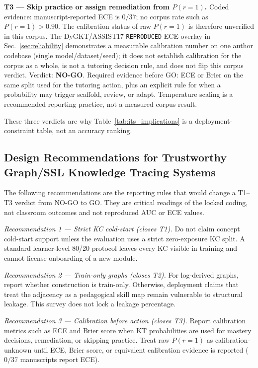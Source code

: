 \documentclass[lettersize,journal]{IEEEtran}
\begin{document}
\textbf{T3 --- Skip practice or assign remediation from $P(r=1)$.}
Coded evidence: manuscript-reported ECE is $0/37$; no corpus rate such as $P(r=1)>0.90$. The calibration status of raw $P(r=1)$ is therefore unverified in this corpus. The DyGKT/ASSIST17 \texttt{REPRODUCED} ECE overlay in Sec.~\ref{sec:reliability} demonstrates a measurable calibration number on one author codebase (single model/dataset/seed); it does not establish calibration for the corpus as a whole, is not a tutoring decision rule, and does not flip this corpus verdict.
Verdict: \textbf{NO-GO}. Required evidence before GO: ECE or Brier on the same split used for the tutoring action, plus an explicit rule for when a probability may trigger scaffold, review, or adapt. Temperature scaling is a recommended reporting practice, not a measured corpus result.

These three verdicts are why Table~\ref{tab:its_implications} is a deployment-constraint table, not an accuracy ranking.

\subsection{Design Recommendations for Trustworthy Graph/SSL Knowledge Tracing Systems}
\label{sec:design_recs}
The following recommendations are the reporting rules that would change a T1--T3 verdict from NO-GO to GO. They are critical readings of the locked coding, not classroom outcomes and not reproduced AUC or ECE values.

\textit{Recommendation 1 --- Strict KC cold-start (closes T1).} Do not claim concept cold-start support unless the evaluation uses a strict zero-exposure KC split. A standard learner-level 80/20 protocol leaves every KC visible in training and cannot license onboarding of a new module.

\textit{Recommendation 2 --- Train-only graphs (closes T2).} For log-derived graphs, report whether construction is train-only. Otherwise, deployment claims that treat the adjacency as a pedagogical skill map remain vulnerable to structural leakage. This survey does not lock a leakage percentage.

\textit{Recommendation 3 --- Calibration before action (closes T3).} Report calibration metrics such as ECE and Brier score when KT probabilities are used for mastery decisions, remediation, or skipping practice. Treat raw $P(r=1)$ as calibration-unknown until ECE, Brier score, or equivalent calibration evidence is reported ($0/37$ manuscripts report ECE).
\end{document}
